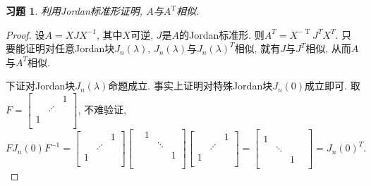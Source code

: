 \documentclass{ctexart}
\newtheorem{exercise}[thm]{习题}
\DeclareMathOperator{\T}{T}
\begin{document}
\begin{exercise}\label{excs:similar:transpose}
利用Jordan标准形证明, $A$与$A^{\T}$相似. 
\end{exercise}
\begin{proof}
	设$A=XJX^{-1}$, 其中$X$可逆, $J$是$A$的Jordan标准形. 
	则$A^T=X^{-\T}J^TX^T$. 只要能证明对任意Jordan块$J_n(\lambda)$, $J_n(\lambda)$与$J_n(\lambda)^T$相似, 就有$J$与$J^T$相似, 从而$A$与$A^T$相似. 

	下证对Jordan块$J_n(\lambda)$命题成立. 事实上证明对特殊Jordan块$J_n(0)$成立即可. 
	取$F=\begin{bmatrix}
		&& 1\\ & \iddots\\ 1\\
	\end{bmatrix}$, 不难验证, 
	\[
		FJ_n(0)F^{-1}=\begin{bmatrix}
		&& 1\\ & \iddots\\ 1\\
	\end{bmatrix}\begin{bmatrix}
				& 1\\ && \ddots \\ &&& 1\\ \\
	\end{bmatrix}\begin{bmatrix}
		&& 1\\ & \iddots\\ 1\\
	\end{bmatrix}=\begin{bmatrix}
				\\ 1\\ & \ddots \\ && 1&\\ 
			\end{bmatrix}=J_n(0)^T.
	\]
\end{proof}
\end{document}

